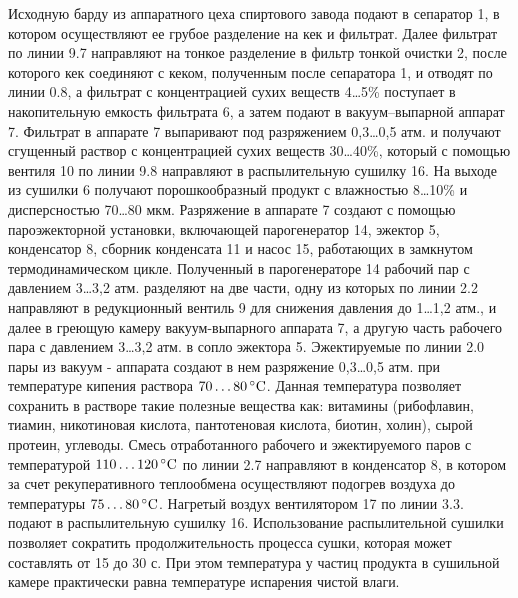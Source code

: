 Исходную барду из аппаратного цеха спиртового завода подают в сепаратор 1, в котором осуществляют ее грубое разделение на кек и фильтрат. 
Далее фильтрат по линии 9.7 направляют на тонкое разделение в фильтр тонкой очистки 2, после которого кек соединяют с кеком, полученным после сепаратора 1, и отводят по линии 0.8, а фильтрат с концентрацией сухих веществ 4\dots5\% поступает в накопительную емкость фильтрата 6, а затем подают в вакуум--выпарной аппарат 7.
Фильтрат в аппарате 7 выпаривают под разряжением 0,3\dots0,5 атм. и получают сгущенный раствор с концентрацией сухих веществ 30\dots40\%, который с помощью вентиля 10 по линии 9.8 направляют в распылительную сушилку 16. 
На выходе из сушилки 6 получают порошкообразный продукт с влажностью 8\dots10\% и дисперсностью 70\dots80 мкм.
Разряжение в аппарате 7 создают с помощью пароэжекторной установки, включающей парогенератор 14, эжектор 5, конденсатор 8, сборник конденсата 11 и насос 15, работающих в замкнутом термодинамическом цикле.
Полученный в парогенераторе 14 рабочий пар с давлением 3\dots3,2 атм. разделяют на две части, одну из которых по линии 2.2 направляют в редукционный вентиль 9 для снижения давления до 1\dots1,2 атм., и далее в греющую камеру вакуум-выпарного аппарата 7, а другую часть рабочего пара с давлением 3\dots3,2 атм. в сопло эжектора 5. 
Эжектируемые по линии 2.0 пары из вакуум - аппарата создают в нем разряжение 0,3\dots0,5 атм. при температуре кипения раствора $70\dots80\,^{\circ}\mathrm{C}$. 
Данная температура позволяет сохранить в растворе такие полезные вещества как: витамины (рибофлавин, тиамин, никотиновая кислота, пантотеновая кислота, биотин, холин), сырой протеин, углеводы.
Смесь отработанного рабочего и эжектируемого паров с температурой $110\dots120\,^{\circ}\mathrm{C}$ по линии 2.7 направляют в конденсатор 8, в котором за счет рекуперативного теплообмена осуществляют подогрев воздуха до температуры $75\dots80\,^{\circ}\mathrm{C}$. 
Нагретый воздух вентилятором 17 по линии 3.3. подают в распылительную сушилку 16. 
Использование распылительной сушилки позволяет сократить продолжительность процесса сушки, которая может составлять от 15 до 30 с. При этом температура у частиц продукта в сушильной камере практически равна температуре испарения чистой влаги. 

